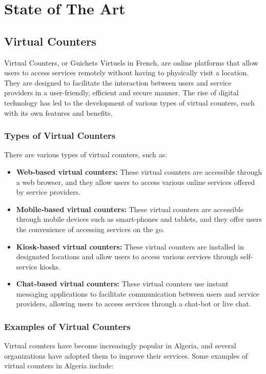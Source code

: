 \chapter{State of The Art}
\section{Virtual Counters}
Virtual Counters, or Guichets Virtuels in French, are online platforms that allow users to access services remotely without having to physically visit a location. They are designed to facilitate the interaction between users and service providers in a user-friendly, efficient and secure manner. The rise of digital technology has led to the development of various types of virtual counters, each with its own features and benefits.

\subsection{Types of Virtual Counters}
There are various types of virtual counters, such as:
\begin{itemize}
    \item \textbf{Web-based virtual counters:} These virtual counters are accessible through a web browser, and they allow users to access various online services offered by service providers.
    \item \textbf{Mobile-based virtual counters:} These virtual counters are accessible through mobile devices such as smart-phones and tablets, and they offer users the convenience of accessing services on the go.
    \item \textbf{Kiosk-based virtual counters:} These virtual counters are installed in designated locations and allow users to access various services through self-service kiosks.
    \item \textbf{Chat-based virtual counters:} These virtual counters use instant messaging applications to facilitate communication between users and service providers, allowing users to access services through a chat-bot or live chat.
\end{itemize}

\subsection{Examples of Virtual Counters}
Virtual counters have become increasingly popular in Algeria, and several organizations have adopted them to improve their services. Some examples of virtual counters in Algeria include:


